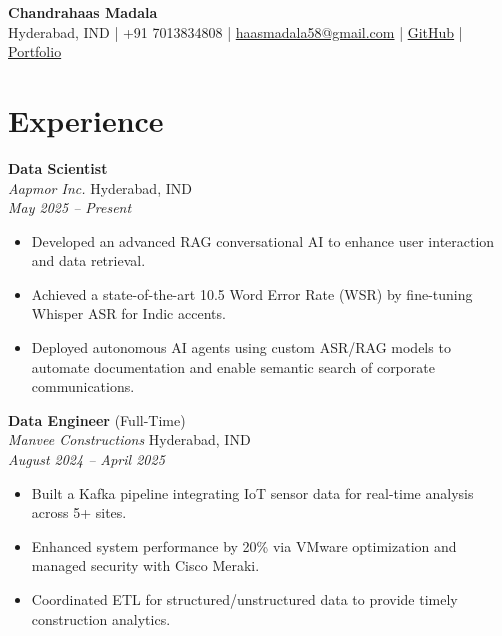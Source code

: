\documentclass[letterpaper,11pt]{article}
\begin{document}
\begin{center}
    \textbf{\Large Chandrahaas Madala} \\ \vspace{2pt}
    \small Hyderabad, IND \quad | \quad +91 7013834808 \quad | \quad \href{mailto:haasmadala58@gmail.com}{haasmadala58@gmail.com}  \quad | \quad \href{https://github.com/HaasChoy/}{GitHub} \quad | \quad \href{https://madhaas.github.io/portfolio/}{Portfolio}
\end{center}


\section{Experience}

\textbf{Data Scientist}  \\
\textit{Aapmor Inc.} \hfill Hyderabad, IND \\
\textit{May 2025 – Present}
\begin{itemize}[leftmargin=*, topsep=2pt, itemsep=-4pt]
    \item Developed an advanced RAG conversational AI to enhance user interaction and data retrieval.
    \item Achieved a state-of-the-art 10.5 Word Error Rate (WSR) by fine-tuning Whisper ASR for Indic accents.
    \item Deployed autonomous AI agents using custom ASR/RAG models to automate documentation and enable semantic search of corporate communications.
\end{itemize}
\vspace{-2pt}

\textbf{Data Engineer} (Full-Time) \\
\textit{Manvee Constructions} \hfill Hyderabad, IND \\
\textit{August 2024 – April 2025}
\begin{itemize}[leftmargin=*, topsep=2pt, itemsep=-4pt]
    \item Built a Kafka pipeline integrating IoT sensor data for real-time analysis across 5+ sites.
    \item Enhanced system performance by 20\% via VMware optimization and managed security with Cisco Meraki.
    \item Coordinated ETL for structured/unstructured data to provide timely construction analytics.
\end{itemize}
\vspace{-2pt}
\end{document}
